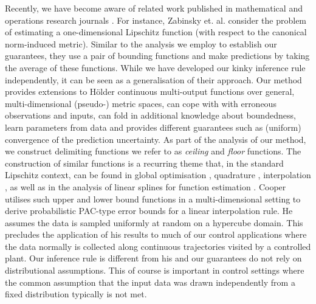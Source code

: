 Recently, we have become aware of related work published in mathematical and operations research journals \cite{Cooper2006,Cooper1995,Zabinsky2003,Beliakov2006,Beliakovsmoothing2007}. For instance, Zabinsky et. al. \cite{Zabinsky2003} consider the problem of estimating a one-dimensional Lipschitz function (with respect to the canonical norm-induced metric). Similar to the analysis we employ to establish our guarantees, they use a pair of bounding functions and make predictions by taking the average of these functions. While we have developed our kinky inference rule independently, it can be seen as a generalisation of their approach. Our method provides extensions to H\"older continuous multi-output functions over general, multi-dimensional (pseudo-) metric spaces, can cope with with erroneous observations and inputs, can fold in additional knowledge about boundedness, learn parameters from data and provides different guarantees such as (uniform) convergence of the prediction uncertainty. 
As part of the analysis of our method, we construct delimiting functions we refer to as \textit{ceiling} and \textit{floor} functions. The construction of similar functions is a recurring theme that, in the standard Lipschitz context, can be found in global  optimisation \cite{Shubert:72}, quadrature \cite{Baran2008}, interpolation \cite{Beliakov2006,Beliakovsmoothing2007}, as well as in the analysis of linear splines for function estimation \cite{Cooper1995}. Cooper \cite{Cooper2006,Cooper1995} utilises such upper and lower bound functions in a multi-dimensional setting to derive probabilistic PAC-type error bounds \cite{Valiant1984} for a linear interpolation rule. He assumes the data is sampled uniformly at random on a hypercube domain. This precludes the application of his results to much of our control applications where the data normally is collected along continuous trajectories visited by a controlled plant. Our inference rule is different from his and our guarantees do not rely on distributional assumptions. This of course is important in control settings where the common assumption that the input data was drawn independently from a fixed distribution typically is not met.
